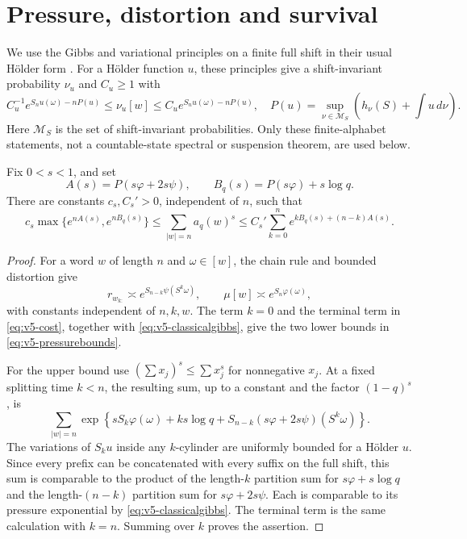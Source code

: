 \section{Pressure, distortion and survival}\label{sec:v5-pressure}
We use the Gibbs and variational principles on a finite full shift in
their usual H\"older form \cite[Chapters~1--2]{Bowen2008}. For a
H\"older function $u$, these principles give a shift-invariant
probability $\nu_u$ and $C_u\ge1$ with
\begin{equation}\label{eq:v5-classicalgibbs}
 C_u^{-1}e^{S_nu(\omega)-nP(u)}\le\nu_u[w]
 \le C_ue^{S_nu(\omega)-nP(u)},
 \quad P(u)=\sup_{\nu\in\mathcal M_S}
           \left(h_\nu(S)+\int u\,d\nu\right).
\end{equation}
Here $\mathcal M_S$ is the set of shift-invariant probabilities.
Only these finite-alphabet statements, not a countable-state
spectral or suspension theorem, are used below.

\begin{lemma}\label{lem:v5-pressure-sum}
Fix $0<s<1$, and set
\[
 A(s)=P(s\varphi+2s\psi),\qquad
 B_q(s)=P(s\varphi)+s\log q.
\]
There are constants $c_s,C_s'>0$, independent of $n$, such that
\begin{equation}\label{eq:v5-pressurebounds}
 c_s\max\{e^{nA(s)},e^{nB_q(s)}\}
 \le \sum_{|w|=n}a_q(w)^s
 \le C_s'\sum_{k=0}^{n}e^{kB_q(s)+(n-k)A(s)}.
\end{equation}
\end{lemma}

\begin{proof}
For a word $w$ of length $n$ and $\omega\in[w]$, the chain rule
and bounded distortion give
\[
 r_{w_{k:}}\asymp e^{S_{n-k}\psi(S^k\omega)},\qquad
 \mu[w]\asymp e^{S_n\varphi(\omega)},
\]
with constants independent of $n,k,w$. The term $k=0$ and the
terminal term in \eqref{eq:v5-cost}, together with
\eqref{eq:v5-classicalgibbs}, give the two lower bounds in
\eqref{eq:v5-pressurebounds}.

For the upper bound use $(\sum x_j)^s\le\sum x_j^s$ for
nonnegative $x_j$. At a fixed splitting time $k<n$, the resulting
sum, up to a constant and the factor $(1-q)^s$, is
\[
 \sum_{|w|=n}\exp\left\{
 sS_k\varphi(\omega)+ks\log q
 +S_{n-k}(s\varphi+2s\psi)(S^k\omega)\right\}.
\]
The variations of $S_ku$ inside any $k$-cylinder are uniformly
bounded for a H\"older $u$. Since every prefix can be concatenated
with every suffix on the full shift, this sum is comparable to
the product of the length-$k$ partition sum for $s\varphi+s\log q$
and the length-$(n-k)$ partition sum for $s\varphi+2s\psi$.
Each is comparable to its pressure exponential by
\eqref{eq:v5-classicalgibbs}. The terminal term is the same
calculation with $k=n$. Summing over $k$ proves the assertion.
\end{proof}

